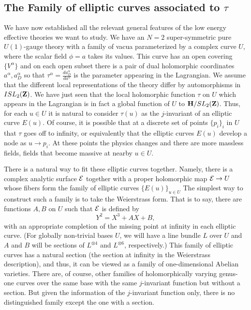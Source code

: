\documentclass[10pt]{article}
\begin{document}
\subsection{The Family of elliptic curves associated to $\tau$}


We have now established all the relevant general features of the
low energy effective theories we want to study. We have an $N=2$
super-symmetric pure 
$U(1)$-gauge theory with a family of vacua parameterized by
a complex curve $U$, where the scalar field $\phi=a$ takes its values. This
curve has an open covering $\{V^\alpha\}$ and on 
each open subset there is a pair of dual holomorphic coordinates
$a^\alpha,a_D^\alpha$ so that
$\tau^\alpha=\frac{da^\alpha_D}{da^\alpha}$ is the parameter appearing
in the Lagrangian. We assume that the different local representations of
the theory differ by automorphisms in $ISL_2({\bf Z})$.
We have just seen that the local holomorphic function $\tau$ on $U$
which appears 
in the Lagrangian is in fact a global function of $U$ to ${\bf
H}/SL_2({\bf Z})$. 
Thus, for each $u\in U$ it is natural to consider $\tau(u)$ as the
$j$-invariant of an elliptic curve $E(u)$. Of course, it is possible
that at a discrete set of points $\{p_i\}_i$ in $U$ that $\tau$ goes off to
infinity, or equivalently that the elliptic curves $E(u)$ develop  a
node as $u\to p_i$.
At these points the physics changes and there are more massless
fields, fields that become massive at nearby $u\in U$. 

There is a natural way to
fit these elliptic curves together. Namely, there is a complex analytic
surface ${\cal E}$ together with a proper holomorphic map
${\cal E}\to U$ whose fibers form the  family of
elliptic curves $\{E(u)\}_{u\in U}$
The simplest way to construct such a family is to take the Weierstrass
form. That is to say, there are functions $A,B$ on $U$ such that
${\cal E}$ is defined by
$$Y^2=X^3+AX+B,$$
with an appropriate completion of the missing point at infinity in
each elliptic curve. (For globally non-trivial bases $U$, we will have a
line bundle $L$ over $U$ and $A$ and $B$ will be sections of
$L^{\otimes 4}$ and $L^{\otimes 6}$, respectively.) This family of
elliptic curves has a natural section (the section at infinity in the
Weierstrass description), and thus, it can be viewed as a family of
one-dimensional Abelian varieties. There are, of course, other
families of  holomorphically varying genus-one curves over the same base with
the same $j$-invariant function but without a section.  But given the
information of the $j$-invariant function only, there is no
distinguished family except the one with a section. 
\end{document}
